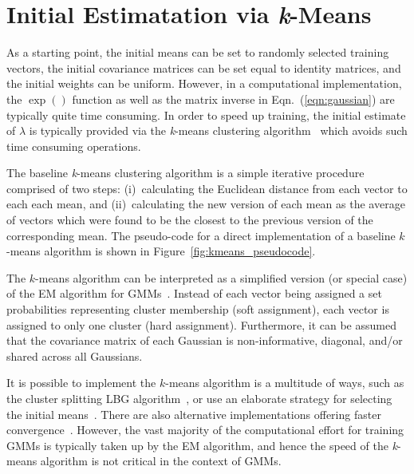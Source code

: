 \section{Initial Estimatation via {\it k}-Means}
\label{sec:initial_estimate}

As a starting point, the initial means can be set to randomly selected training vectors,
the initial covariance matrices can be set equal to identity matrices, 
and the initial weights can be uniform.
However, in a computational implementation, the $\exp()$ function as well as the matrix inverse in Eqn.~(\ref{eqn:gaussian}) are typically quite time consuming.
In order to speed up training, the initial estimate of $\lambda$ is typically provided via the {\it k}-means clustering algorithm~\cite{Bishop_2006,Duda01,Kulis_2012}
which avoids such time consuming operations.

The baseline {\it k}-means clustering algorithm is a simple iterative procedure comprised of two steps:
(i)~calculating the Euclidean distance from each vector to each each mean,
and
(ii)~calculating the new version of each mean as the average of vectors which were found to be the closest to the previous version of the corresponding mean.
The pseudo-code for a direct implementation of a baseline $k$-means algorithm is shown in Figure~\ref{fig:kmeans_pseudocode}.

The $k$-means algorithm can be interpreted as a simplified version (or special case) of the EM algorithm for GMMs~\cite{Kulis_2012}.
Instead of each vector being assigned a set probabilities representing cluster membership (soft assignment),
each vector is assigned to only one cluster (hard assignment).
Furthermore, it can be assumed that the covariance matrix of each Gaussian is non-informative, diagonal, and/or shared across all Gaussians.

It is possible to implement the $k$-means algorithm is a multitude of ways,
such as the cluster splitting LBG algorithm~\cite{Linde80},
or use an elaborate strategy for selecting the initial means~\cite{Arthur_2007}.
There are also alternative implementations offering faster convergence~\cite{TODO,TODO}.
However, the vast majority of the computational effort for training GMMs is typically taken up by the EM algorithm,
and hence the speed of the {\it k}-means algorithm is not critical in the context of GMMs.


